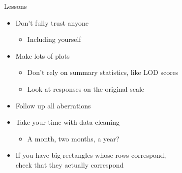 \documentclass[12pt,t]{beamer}
\begin{document}
\begin{frame}[c]{Lessons}

\small

\begin{itemize}
\itemsep8pt

\item Don't fully trust anyone
\begin{itemize}
\item Including yourself
\end{itemize}

\item Make lots of plots
\begin{itemize}
\item Don't rely on summary statistics, like LOD scores
\item Look at responses on the original scale
\end{itemize}

\item Follow up all aberrations

\item Take your time with data cleaning
\begin{itemize}
\item A month, two months, a year?
\end{itemize}

\item If you have big rectangles whose rows correspond, \\
  check that they {\hilit actually} correspond

\end{itemize}
\note{}
\end{frame}
\end{document}
